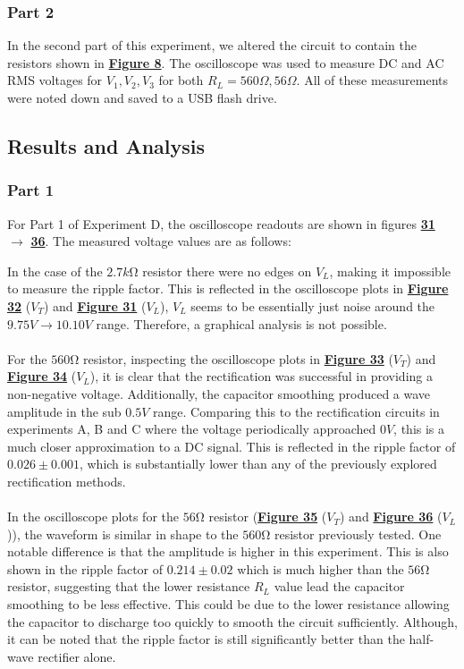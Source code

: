 \documentclass[
	letterpaper
	12pt
]{template}
\newcommand{\bref}[2]{\textbf{\hyperref[#1]{#2}}}
\begin{document}
\subsubsection{Part 2}\label{method::D2}
In the second part of this experiment, we altered the circuit to contain the resistors shown in \textbf{\hyperref[apparatus::D]{Figure 8}}. The oscilloscope was used to measure DC and AC RMS voltages for $V_1, V_2, V_3$ for both $R_L = 560\Omega, 56\Omega$. All of these measurements were noted down and saved to a USB flash drive.



\subsection{Results and Analysis}
{\subsubsection{Part 1}}
For Part 1 of Experiment D, the oscilloscope readouts are shown in figures \bref{data::D}{31} $\rightarrow$ \bref{data::D3}{36}. The measured voltage values are as follows:

In the case of the  $2.7\unit{k \ohm}$ resistor there were no edges on $V_L$, making it impossible to measure the ripple factor. This is reflected in the oscilloscope plots in \bref{data::D}{Figure 32} ($V_T$) and \bref{data::D}{Figure 31} ($V_L$), $V_L$ seems to be essentially just noise around the $9.75\unit{V} \rightarrow 10.10\unit{V}$ range. Therefore, a graphical analysis is not possible.\\\\
For the $560\unit{\ohm}$ resistor, inspecting the oscilloscope plots in \bref{data::D2}{Figure 33} ($V_T$) and \bref{data::D2}{Figure 34} ($V_L$), it is clear that the rectification was successful in providing a non-negative voltage. Additionally, the capacitor smoothing produced a wave amplitude in the sub $0.5\unit{V}$ range. Comparing this to the rectification circuits in experiments A, B and C where the voltage periodically approached $0V$, this is a much closer approximation to a DC signal. This is reflected in the ripple factor of $0.026\pm 0.001$, which is substantially lower than any of the previously explored rectification methods. \\\\
In the oscilloscope plots for the $56\unit{\ohm}$ resistor (\bref{data::D3}{Figure 35} ($V_T$) and \bref{data::D3}{Figure 36} ($V_L$)), the waveform is similar in shape to the $560\unit\ohm$ resistor previously tested. One notable difference is that the amplitude is higher in this experiment. This is also shown in the ripple factor of $0.214\pm 0.02$ which is much higher than the $56\unit{\ohm}$ resistor, suggesting that the lower resistance $R_L$ value lead the capacitor smoothing to be less effective. This could be due to the lower resistance allowing the capacitor to discharge too quickly to smooth the circuit sufficiently. Although, it can be noted that the ripple factor is still significantly better than the half-wave rectifier alone.
\end{document}
